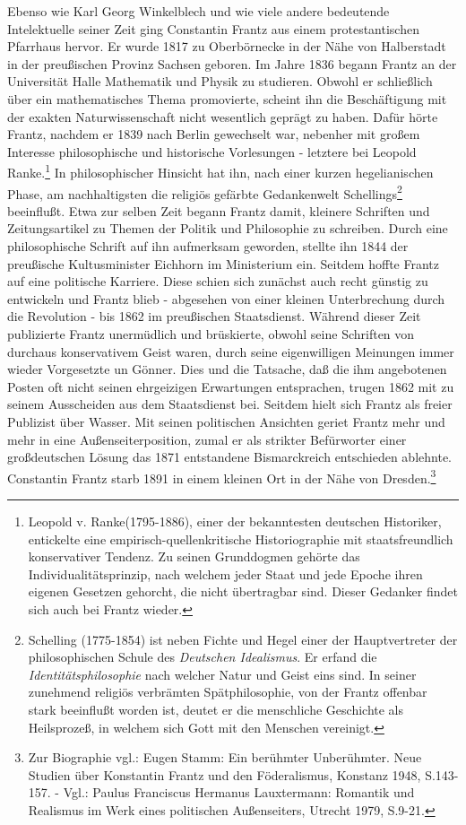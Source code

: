 \documentclass[a4paper,12pt]{article}
\begin{document}
Ebenso wie Karl Georg Winkelblech und wie viele andere bedeutende
Intelektuelle seiner Zeit ging Constantin Frantz aus einem
protestantischen Pfarrhaus hervor. Er wurde 1817 zu Oberbörnecke in
der Nähe von Halberstadt in der preußischen Provinz Sachsen
geboren. Im Jahre 1836 begann Frantz an der Universität Halle
Mathematik und Physik zu studieren. Obwohl er schließlich über ein
mathematisches Thema promovierte, scheint ihn die Beschäftigung mit
der exakten Naturwissenschaft nicht wesentlich geprägt zu haben. Dafür
hörte Frantz, nachdem er 1839 nach Berlin gewechselt war, nebenher mit
großem Interesse philosophische und historische Vorlesungen - letztere
bei Leopold Ranke.\footnote{Leopold v. Ranke(1795-1886), einer der
bekanntesten deutschen Historiker, entickelte eine
empirisch-quellenkritische Historiographie mit staatsfreundlich
konservativer Tendenz. Zu seinen Grunddogmen gehörte das
Individualitätsprinzip, nach welchem jeder Staat und jede Epoche ihren
eigenen Gesetzen gehorcht, die nicht übertragbar sind. Dieser Gedanker
findet sich auch bei Frantz wieder.} In philosophischer Hinsicht hat
ihn, nach einer kurzen hegelianischen Phase, am nachhaltigsten die
religiös gefärbte Gedankenwelt Schellings\footnote{Schelling
(1775-1854) ist neben Fichte und Hegel einer der Hauptvertreter der
philosophischen Schule des {\em Deutschen Idealismus}. Er erfand die
{\em Identitätsphilosophie} nach welcher Natur und Geist eins sind. In
seiner zunehmend religiös verbrämten Spätphilosophie, von der Frantz
offenbar stark beeinflußt worden ist, deutet er die menschliche
Geschichte als Heilsprozeß, in welchem sich Gott mit den Menschen
vereinigt.}  beeinflußt. Etwa zur selben Zeit begann Frantz damit,
kleinere Schriften und Zeitungsartikel zu Themen der Politik und
Philosophie zu schreiben. Durch eine philosophische Schrift auf ihn
aufmerksam geworden, stellte ihn 1844 der preußische Kultusminister
Eichhorn im Ministerium ein. Seitdem hoffte Frantz auf eine politische
Karriere. Diese schien sich zunächst auch recht günstig zu entwickeln
und Frantz blieb - abgesehen von einer kleinen Unterbrechung durch die
Revolution - bis 1862 im preußischen Staatsdienst. Während dieser Zeit
publizierte Frantz unermüdlich und brüskierte, obwohl seine Schriften
von durchaus konservativem Geist waren, durch seine eigenwilligen
Meinungen immer wieder Vorgesetzte un Gönner. Dies und die Tatsache,
daß die ihm angebotenen Posten oft nicht seinen ehrgeizigen
Erwartungen entsprachen, trugen 1862 mit zu seinem Ausscheiden aus dem
Staatsdienst bei. Seitdem hielt sich Frantz als freier Publizist über
Wasser. Mit seinen politischen Ansichten geriet Frantz mehr und mehr
in eine Außenseiterposition, zumal er als strikter Befürworter einer
großdeutschen Lösung das 1871 entstandene Bismarckreich entschieden
ablehnte. Constantin Frantz starb 1891 in einem kleinen Ort in der
Nähe von Dresden.\footnote{Zur Biographie vgl.: Eugen
Stamm\cite{stamm}: Ein berühmter Unberühmter. Neue Studien über
Konstantin Frantz und den Föderalismus, Konstanz 1948, S.143-157. -
Vgl.: Paulus Franciscus Hermanus Lauxtermann\cite{lauxtermann}:
Romantik und Realismus im Werk eines politischen Außenseiters, Utrecht
1979, S.9-21.}
\end{document}
